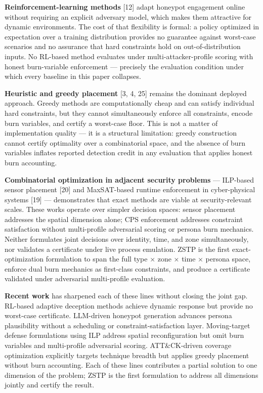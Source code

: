 \documentclass[
  11pt,
]{article}
\begin{document}
\textbf{Reinforcement-learning methods} {[}12{]} adapt honeypot
engagement online without requiring an explicit adversary model, which
makes them attractive for dynamic environments. The cost of that
flexibility is formal: a policy optimized in expectation over a training
distribution provides no guarantee against worst-case scenarios and no
assurance that hard constraints hold on out-of-distribution inputs. No
RL-based method evaluates under multi-attacker-profile scoring with
honest burn-variable enforcement --- precisely the evaluation condition
under which every baseline in this paper collapses.

\textbf{Heuristic and greedy placement} {[}3, 4, 25{]} remains the
dominant deployed approach. Greedy methods are computationally cheap and
can satisfy individual hard constraints, but they cannot simultaneously
enforce all constraints, encode burn variables, and certify a worst-case
floor. This is not a matter of implementation quality --- it is a
structural limitation: greedy construction cannot certify optimality
over a combinatorial space, and the absence of burn variables inflates
reported detection credit in any evaluation that applies honest burn
accounting.

\textbf{Combinatorial optimization in adjacent security problems} ---
ILP-based sensor placement {[}20{]} and MaxSAT-based runtime enforcement
in cyber-physical systems {[}19{]} --- demonstrates that exact methods
are viable at security-relevant scales. These works operate over simpler
decision spaces: sensor placement addresses the spatial dimension alone;
CPS enforcement addresses constraint satisfaction without multi-profile
adversarial scoring or persona burn mechanics. Neither formulates joint
decisions over identity, time, and zone simultaneously, nor validates a
certificate under live process emulation. ZSTP is the first
exact-optimization formulation to span the full type × zone × time ×
persona space, enforce dual burn mechanics as first-class constraints,
and produce a certificate validated under adversarial multi-profile
evaluation.

\textbf{Recent work} has sharpened each of these lines without closing
the joint gap. RL-based adaptive deception methods achieve dynamic
response but provide no worst-case certificate. LLM-driven honeypot
generation advances persona plausibility without a scheduling or
constraint-satisfaction layer. Moving-target defense formulations using
ILP address spatial reconfiguration but omit burn variables and
multi-profile adversarial scoring. ATT\&CK-driven coverage optimization
explicitly targets technique breadth but applies greedy placement
without burn accounting. Each of these lines contributes a partial
solution to one dimension of the problem; ZSTP is the first formulation
to address all dimensions jointly and certify the result.
\end{document}
